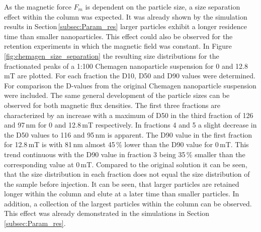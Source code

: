 \FloatBarrier
As the magnetic force $F_{m}$ is dependent on the particle size, a size separation effect within the column was expected. It was already shown by the simulation results in Section\,\ref{subsec:Param_res} larger particles exhibit a longer residence time than smaller nanoparticles. This effect could also be observed for the retention experiments in which the magnetic field was constant. In Figure\,\ref{fig:chemagen_size_separation} the resulting size distributions for the fractionated peaks of a 1:100 Chemagen nanoparticle suspension for 0 and 12.8\,mT are plotted. For each fraction the D10, D50 and D90 values were determined. For comparison the D-values from the original Chemagen nanoparticle suspension were included. The same general development of the particle sizes can be observed for both magnetic flux densities. The first three fractions are characterized by an increase with a maximum of D50 in the third fraction of 126 and 97\,nm for 0 and 12.8\,mT respectively. In fractions 4 and 5 a slight decrease in the D50 values to 116 and 95\,nm is apparent. The D90 value in the first fraction for 12.8\,mT is with 81\,nm almost 45\,\% lower than the D90 value for 0\,mT. This trend continuous with the D90 value in fraction 3 being 35\,\% smaller than the corresponding value at 0\,mT. Compared to the original solution it can be seen, that the size distribution in each fraction does not equal the size distribution of the sample before injection. It can be seen, that larger particles are retained longer within the column and elute at a later time than smaller particles. In addition, a collection of the largest particles within the column can be observed.  This effect was already demonstrated in the simulations in Section\,\ref{subsec:Param_res}.     

